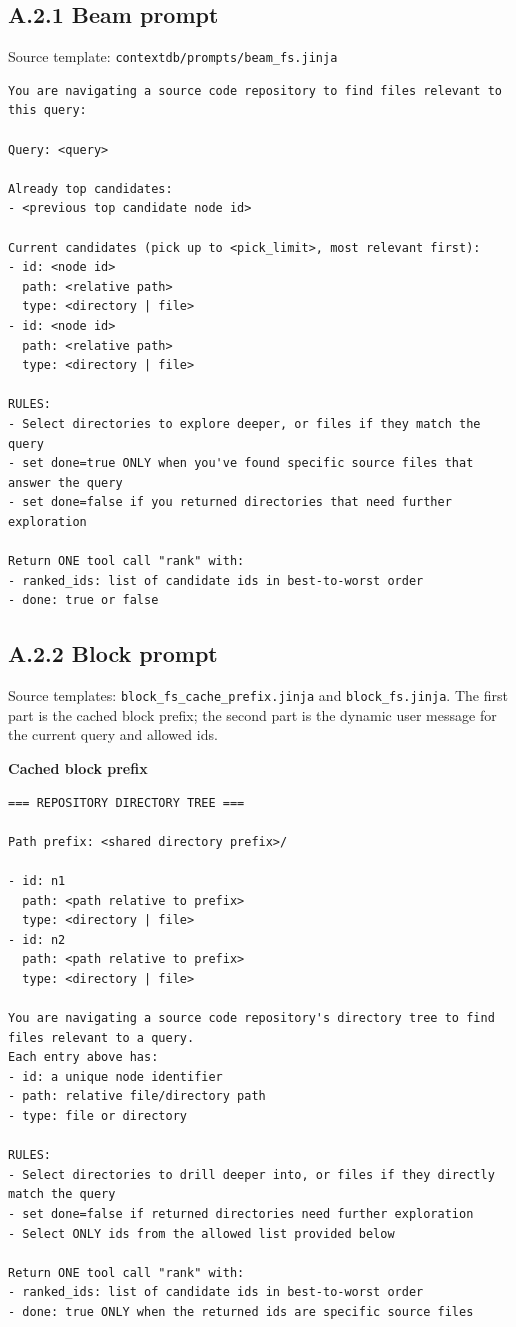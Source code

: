 \documentclass{article}
\begin{document}
\subsection*{A.2.1 Beam prompt}

\noindent Source template: \texttt{contextdb/prompts/beam\_fs.jinja}
\begin{lstlisting}
You are navigating a source code repository to find files relevant to this query:

Query: <query>

Already top candidates:
- <previous top candidate node id>

Current candidates (pick up to <pick_limit>, most relevant first):
- id: <node id>
  path: <relative path>
  type: <directory | file>
- id: <node id>
  path: <relative path>
  type: <directory | file>

RULES:
- Select directories to explore deeper, or files if they match the query
- set done=true ONLY when you've found specific source files that answer the query
- set done=false if you returned directories that need further exploration

Return ONE tool call "rank" with:
- ranked_ids: list of candidate ids in best-to-worst order
- done: true or false
\end{lstlisting}

\subsection*{A.2.2 Block prompt}

\noindent Source templates: \texttt{block\_fs\_cache\_prefix.jinja} and
\texttt{block\_fs.jinja}. The first part is the cached block prefix; the second
part is the dynamic user message for the current query and allowed ids.

\noindent\textbf{Cached block prefix}
\begin{lstlisting}
=== REPOSITORY DIRECTORY TREE ===

Path prefix: <shared directory prefix>/

- id: n1
  path: <path relative to prefix>
  type: <directory | file>
- id: n2
  path: <path relative to prefix>
  type: <directory | file>

You are navigating a source code repository's directory tree to find files relevant to a query.
Each entry above has:
- id: a unique node identifier
- path: relative file/directory path
- type: file or directory

RULES:
- Select directories to drill deeper into, or files if they directly match the query
- set done=false if returned directories need further exploration
- Select ONLY ids from the allowed list provided below

Return ONE tool call "rank" with:
- ranked_ids: list of candidate ids in best-to-worst order
- done: true ONLY when the returned ids are specific source files
\end{lstlisting}
\end{document}
